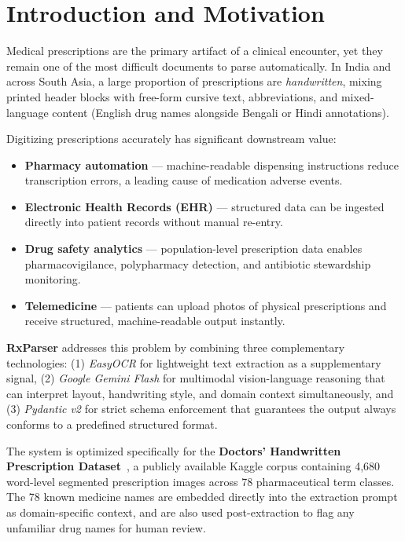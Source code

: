 \documentclass[12pt,a4paper]{article}
\begin{document}
\tableofcontents
\newpage

\section{Introduction and Motivation}

Medical prescriptions are the primary artifact of a clinical encounter, yet they
remain one of the most difficult documents to parse automatically. In India and
across South Asia, a large proportion of prescriptions are \emph{handwritten},
mixing printed header blocks with free-form cursive text, abbreviations, and
mixed-language content (English drug names alongside Bengali or Hindi annotations).

Digitizing prescriptions accurately has significant downstream value:

\begin{itemize}[noitemsep]
    \item \textbf{Pharmacy automation} — machine-readable dispensing instructions reduce
          transcription errors, a leading cause of medication adverse events.
    \item \textbf{Electronic Health Records (EHR)} — structured data can be ingested
          directly into patient records without manual re-entry.
    \item \textbf{Drug safety analytics} — population-level prescription data enables
          pharmacovigilance, polypharmacy detection, and antibiotic stewardship monitoring.
    \item \textbf{Telemedicine} — patients can upload photos of physical prescriptions
          and receive structured, machine-readable output instantly.
\end{itemize}

\textbf{RxParser} addresses this problem by combining three complementary technologies:
(1) \emph{EasyOCR} for lightweight text extraction as a supplementary signal,
(2) \emph{Google Gemini Flash} for multimodal vision-language reasoning that can
interpret layout, handwriting style, and domain context simultaneously, and
(3) \emph{Pydantic v2} for strict schema enforcement that guarantees the output
always conforms to a predefined structured format.

The system is optimized specifically for the \textbf{Doctors' Handwritten
Prescription Dataset}~\cite{bdprescription}, a publicly available Kaggle corpus
containing 4{,}680 word-level segmented prescription images across 78 pharmaceutical
term classes. The 78 known medicine names are embedded directly into the extraction
prompt as domain-specific context, and are also used post-extraction to flag any
unfamiliar drug names for human review.
\end{document}
